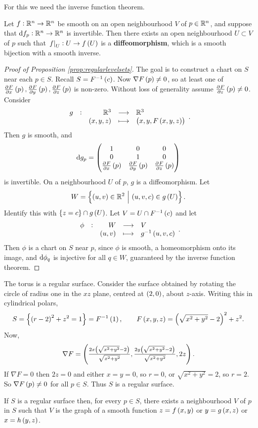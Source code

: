 For this we need the inverse function theorem.

\begin{theorem}
Let $ f : \mathbb{R}^n \to \mathbb{R}^n $ be smooth on an open neighbourhood $ V $ of $ p \in \mathbb{R}^n $, and suppose that $ \mathrm{d} f_p : \mathbb{R}^n \to \mathbb{R}^n $ is invertible. Then there exists an open neighbourhood $ U \subset V $ of $ p $ such that $ \eval{f}_U : U \to f\br{U} $ is a \textbf{diffeomorphism}, which is a smooth bijection with a smooth inverse.
\end{theorem}

\begin{proof}[Proof of Proposition \ref{prop:regularlevelsets}]
The goal is to construct a chart on $ S $ near each $ p \in S $. Recall $ S = F^{-1}\br{c} $. Now $ \nabla F\br{p} \ne 0 $, so at least one of $ \tpd{F}{x}\br{p}, \tpd{F}{y}\br{p}, \tpd{F}{z}\br{p} $ is non-zero. Without loss of generality assume $ \tpd{F}{z}\br{p} \ne 0 $. Consider
$$ \function[g]{\RR^3}{\RR^3}{\br{x, y, z}}{\br{x, y, F\br{x, y, z}}}. $$
Then $ g $ is smooth, and
$$ \d g_p = \threebythree{1}{0}{0}{0}{1}{0}{\tpd{F}{x}\br{p}}{\tpd{F}{y}\br{p}}{\tpd{F}{z}\br{p}} $$
is invertible. On a neighbourhood $ U $ of $ p $, $ g $ is a diffeomorphism. Let
$$ W = \cbr{\br{u, v} \in \RR^2 \st \br{u, v, c} \in g\br{U}}. $$
Identify this with $ \cbr{z = c} \cap g\br{U} $. Let $ V = U \cap F^{-1}\br{c} $ and let
$$ \function[\phi]{W}{V}{\br{u, v}}{g^{-1}\br{u, v, c}}. $$
Then $ \phi $ is a chart on $ S $ near $ p $, since $ \phi $ is smooth, a homeomorphism onto its image, and $ \mathrm{d}\phi_q $ is injective for all $ q \in W $, guaranteed by the inverse function theorem.
\end{proof}

\begin{example*}
The torus is a regular surface. Consider the surface obtained by rotating the circle of radius one in the $ xz $ plane, centred at $ \br{2, 0} $, about $ z $-axis. Writing this in cylindrical polars,
$$ S = \cbr{\br{r - 2}^2 + z^2 = 1} = F^{-1}\br{1}, \qquad F\br{x, y, z} = \br{\sqrt{x^2 + y^2} - 2}^2 + z^2. $$
Now,
$$ \nabla F = \br{\tfrac{2x\br{\sqrt{x^2 + y^2} - 2}}{\sqrt{x^2 + y^2}}, \tfrac{2y\br{\sqrt{x^2 + y^2} - 2}}{\sqrt{x^2 + y^2}}, 2z}. $$
If $ \nabla F = 0 $ then $ 2z = 0 $ and either $ x = y = 0 $, so $ r = 0 $, or $ \sqrt{x^2 + y^2} = 2 $, so $ r = 2 $. So $ \nabla F\br{p} \ne 0 $ for all $ p \in S $. Thus $ S $ is a regular surface.
\end{example*}

\begin{proposition}
If $ S $ is a regular surface then, for every $ p \in S $, there exists a neighbourhood $ V $ of $ p $ in $ S $ such that $ V $ is the graph of a smooth function $ z = f\br{x, y} $ or $ y = g\br{x, z} $ or $ x = h\br{y, z} $.
\end{proposition}

